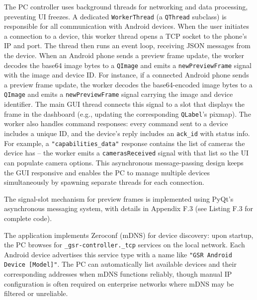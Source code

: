The PC controller uses background threads for networking and data processing, preventing UI freezes. A dedicated \texttt{WorkerThread} (a \texttt{QThread} subclass) is responsible for all communication with Android devices. When the user initiates a connection to a device, this worker thread opens a TCP socket to the phone's IP and port. The thread then runs an event loop, receiving JSON messages from the device. When an Android phone sends a preview frame update, the worker decodes the base64 image bytes to a \texttt{QImage} and emits a \texttt{newPreviewFrame} signal with the image and device ID. For instance, if a connected Android phone sends a preview frame update, the worker decodes the base64-encoded image bytes to a \texttt{QImage} and emits a \texttt{newPreviewFrame} signal carrying the image and device identifier. The main GUI thread connects this signal to a slot that displays the frame in the dashboard (e.g., updating the corresponding \texttt{QLabel}'s pixmap). The worker also handles command responses: every command sent to a device includes a unique ID, and the device's reply includes an \texttt{ack\_id} with status info. For example, a \texttt{"capabilities\_data"} response contains the list of cameras the device has -- the worker emits a \texttt{camerasReceived} signal with that list so the UI can populate camera options. This asynchronous message-passing design keeps the GUI responsive and enables the PC to manage multiple devices simultaneously by spawning separate threads for each connection.

The signal-slot mechanism for preview frames is implemented using PyQt's asynchronous messaging system, with details in Appendix F.3 (see Listing F.3 for complete code).

The application implements Zeroconf (mDNS) \cite{ref19} for device discovery: upon startup, the PC browses for \texttt{\_gsr-controller.\_tcp} services on the local network. Each Android device advertises this service type with a name like \texttt{"GSR Android Device [Model]"}. The PC can automatically list available devices and their corresponding addresses when mDNS functions reliably, though manual IP configuration is often required on enterprise networks where mDNS may be filtered or unreliable.

